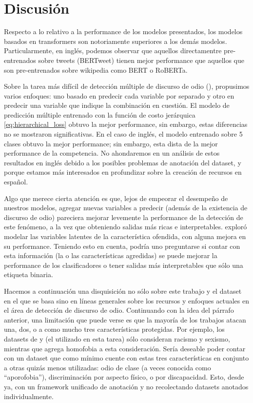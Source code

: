 \section{Discusión}

Respecto a lo relativo a la performance de los modelos presentados, los modelos basados en transformers son notoriamente superiores a los demás modelos. Particularmente, en inglés, podemos observar que aquellos directamentre pre-entrenados sobre tweets (BERTweet) tienen mejor performance que aquellos que son pre-entrenados sobre wikipedia como BERT o RoBERTa.

Sobre la tarea más difícil de detección múltiple de discurso de odio (\subtaskb{}), propusimos varios enfoques: uno basado en predecir cada variable por separado y otro en predecir una variable que indique la combinación en cuestión. El modelo de predicción múltiple entrenado con la función de costo jerárquica \ref{eq:hierarchical_loss} obtuvo la mejor performance, sin embargo, estas diferencias no se mostraron significativas. En el caso de inglés, el modelo entrenado sobre 5 clases obtuvo la mejor performance; sin embargo, esta dista de la mejor performance de la competencia. No ahondaremos en un análisis de estos resultados en inglés debido a los posibles problemas de anotación del dataset, y porque estamos más interesados en profundizar sobre la creación de recursos en español.

Algo que merece cierta atención es que, lejos de empeorar el desempeño de nuestros modelos, agregar nuevas variables a predecir (además de la existencia de discurso de odio) pareciera mejorar levemente la performance de la detección de este fenómeno, a la vez que obteniendo salidas más ricas e interpretables. \citet{gertner-etal-2019-mitre} exploró modelar las variables latentes de la característica ofendida, con alguna mejora en su performance. Teniendo esto en cuenta, podría uno preguntarse si contar con esta información (la o las características agredidas) se puede mejorar la performance de los clasificadores o tener salidas más interpretables que sólo una etiqueta binaria.

Hacemos a continuación una disquisición no sólo sobre este trabajo y el dataset en el que se basa sino en líneas generales sobre los recursos y enfoques actuales en el área de detección de discurso de odio. Continuando con la idea del párrafo anterior, una limitación que puede verse es que la mayoría de los trabajos atacan una, dos, o a como mucho tres características protegidas. Por ejemplo, los datasets de \cite{waseem2016hateful} y \cite{hateval2019semeval} (el utilizado en esta tarea) sólo consideran racismo y sexismo, mientras que \citet{Davidson2017AutomatedHS} agrega homofobia a esta consideración. Sería deseable poder contar con un dataset que como mínimo cuente con estas tres características en conjunto a otras quizás menos utilizadas: odio de clase (a veces conocida como ``aporofobia''), discriminación por aspecto físico, o por discapacidad. Esto, desde ya, con un framework unificado de anotación y no recolectando datasets anotados individualmente.

